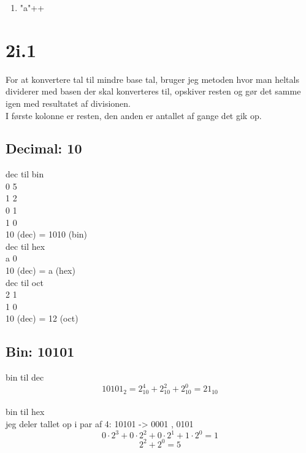 \documentclass[12pt, a4paper, hidelinks]{article}
\begin{document}
\begin{enumerate}
\item "a"++
\end{enumerate}

\section{2i.1}
For at konvertere tal til mindre base tal, bruger jeg metoden hvor man heltals dividerer med basen der skal konverteres til, opskiver resten og gør det samme igen med resultatet af divisionen. \\
I første kolonne er resten, den anden er antallet af gange det gik op. \\

\subsection{Decimal: 10}

dec til  bin \\
0   5 \\
1   2 \\
0   1 \\
1   0 \\

10 (dec) = 1010 (bin) \\

dec til hex \\
a 0 \\

10 (dec) = a (hex) \\

dec til oct \\
2 1 \\
1 0 \\

10 (dec) = 12 (oct) \\


\subsection{Bin: 10101}
bin til dec \\
\[ 10101_2 = 2_{10}^4 + 2_{10}^2 + 2_{10}^0 = 21_{10}        \] \\

bin til hex \\
jeg deler tallet op i par af 4: 10101 -> 0001 , 0101 \\
\[ 0 \cdot 2^3 + 0 \cdot 2^2 + 0 \cdot 2^1 + 1 \cdot 2^0 = 1 \]
\[ 2^2 + 2^0 = 5 \]
\end{document}
